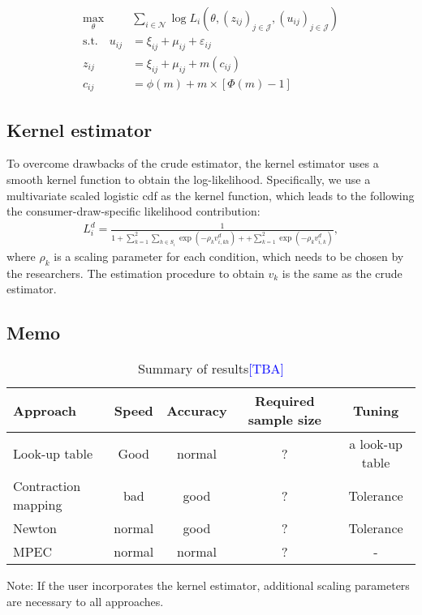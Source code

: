 \documentclass[12pt]{article}
\begin{document}
\begin{align*}
    \max_{\theta}& \sum_{i\in \mathcal{N}} \log L_{i}(\theta,(z_{ij})_{j\in \mathcal{J}},(u_{ij})_{j\in \mathcal{J}})\nonumber\\
    \text{s.t.}\quad u_{i j} & =\xi_{i j}+\mu_{i j}+\varepsilon_{i j}\label{eq:mpec_formula}\\
    z_{i j}&=\xi_{i j}+\mu_{i j}+m\left(c_{i j}\right) \nonumber\\
    c_{i j}&=\phi(m)+m \times[\Phi(m)-1] \nonumber
\end{align*}

\subsection{Kernel estimator}
To overcome drawbacks of the crude estimator, the kernel estimator uses a smooth kernel function to obtain the log-likelihood. Specifically, we use a multivariate scaled logistic cdf as the kernel function, which leads to the following the consumer-draw-specific likelihood contribution:
\begin{align*}
    L_i^d = \frac{1}{1 + \sum_{k=1}^2 \sum_{h \in S_i} \exp (- \rho_k v^d_{i,kh}) +  + \sum_{k=1}^2 \exp (- \rho_k v^d_{i,k})},
\end{align*}
where $\rho_k$ is a scaling parameter for each condition, which needs to be chosen by the researchers. The estimation procedure to obtain $v_k$ is the same as the crude estimator.

\subsection{Memo}

\begin{table}[!htbp]
  \begin{center}
      \caption{Summary of results\textcolor{blue}{[TBA]}}
      \begin{tabular}{lcccc} \hline
   Approach &  Speed & Accuracy & Required sample size & Tuning\\ 
   \hline
   Look-up table & Good & normal & ? & a look-up table \\ 
   Contraction mapping & bad & good & ? & Tolerance \\ 
   Newton & normal & good & ? & Tolerance \\ 
   MPEC & normal & normal & ? & - \\ 
   \hline
 \end{tabular}
 \label{tb:results} 
  \end{center}
  \footnotesize
  Note: If the user incorporates the kernel estimator, additional scaling parameters are necessary to all approaches.
\end{table} 
\end{document}

